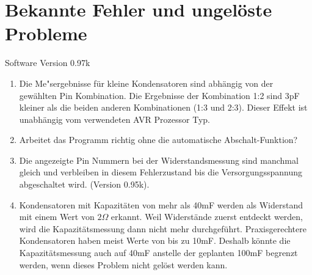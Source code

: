 
\chapter{Bekannte Fehler und ungel\"oste Probleme}
{\center Software Version 0.97k}

\begin{enumerate}
\item Die Me"sergebnisse f\"ur kleine Kondensatoren sind abh\"angig von der gew\"ahlten Pin Kombination.
Die Ergebnisse der Kombination 1:2 sind 3pF kleiner als die beiden anderen Kombinationen (1:3 und 2:3).
Dieser Effekt ist unabh\"angig vom verwendeten AVR Prozessor Typ.
\item Arbeitet das Programm richtig ohne die automatische Abschalt-Funktion?
\item Die angezeigte Pin Nummern bei der Widerstandsmessung sind manchmal gleich und verbleiben in diesem
Fehlerzustand bis die Versorgungsspannung abgeschaltet wird.
(Version 0.95k).
\item Kondensatoren mit Kapazit\"aten von mehr als 40mF werden als Widerstand mit einem Wert von \(2\Omega\) erkannt.
Weil Widerst\"ande zuerst entdeckt werden, wird die Kapazit\"atsmessung dann nicht mehr durchgef\"uhrt.
Praxisgerechtere Kondensatoren haben meist Werte von bis zu 10mF.
Deshalb k\"onnte die Kapazit\"atsmessung auch auf 40mF anstelle der geplanten 100mF begrenzt werden, wenn dieses Problem nicht
gel\"ost werden kann.

\end{enumerate}
